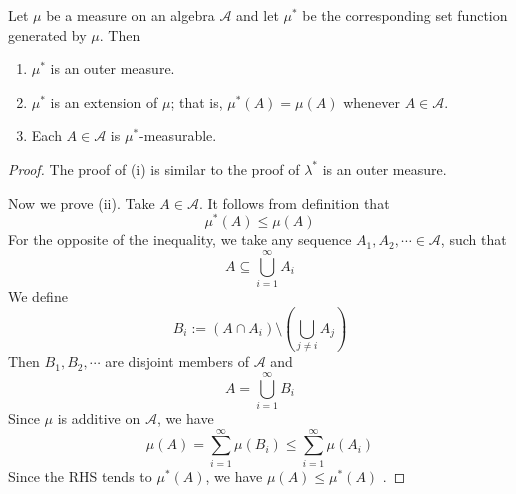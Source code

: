 \documentclass[../main.tex]{subfiles}
\begin{document}
\begin{theorem}{}{}
Let $\mu$ be a measure on an algebra $\mathcal{A}$ and let $\mu^*$ be the corresponding set function generated by $\mu$. Then
\begin{enumerate}
\item[(i)] $\mu^*$ is an outer measure.
\item[(ii)] $\mu^*$ is an extension of $\mu$; that is, $\mu^*(A) = \mu(A)$ whenever $A \in \mathcal{A}$.
\item[(iii)] Each $A \in \mathcal{A}$ is $\mu^*$-measurable.
\end{enumerate}
\end{theorem}
\begin{proof}
    The proof of (i) is similar to the proof of \(   \lambda ^{*}  \) is an outer measure. 
    
    Now we prove (ii). Take \(  A\in \mathcal{A}  \). It follows from definition that \[
    \mu ^{*}\left( A \right)\le \mu \left( A \right)  
    \] For the opposite of the inequality, we take any sequence \(  A_1 ,A_2,\cdots  \in \mathcal{A}  \), such that \[
    A\subseteq \bigcup _{i= 1}^{\infty}A_{i}
    \]We define \[
    B_{i}:= \left( A\cap A_{i} \right)\setminus \left( \bigcup _{j\neq i} A_{j} \right)  
    \]Then \(  B_1,B_2,\cdots   \) are disjoint members of \(  \mathcal{A}  \) and \[
    A= \bigcup _{i= 1}^{\infty}B_{i}
    \] Since \(  \mu   \) is additive on \(  \mathcal{A}  \), we have     \[
    \mu \left( A \right) = \sum _{i= 1}^{\infty}\mu \left( B_{i} \right)\le \sum _{i= 1}^{\infty}\mu \left( A_{i} \right)  
    \]Since the RHS tends to \(  \mu ^{*}\left( A \right)   \), we have \(  \mu \left( A \right)\le \mu ^{*}\left( A \right)    \)  . 


\end{proof}
\end{document}
